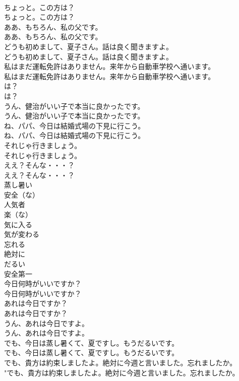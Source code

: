\documentclass[8pt]{extreport}
\begin{document}
\begin{CJK}{UTF8}{min}
\\	ちょっと。この方は？	
\\	ちょっと。この方は？ 
\\	ああ、もちろん、私の父です。	
\\	ああ、もちろん、私の父です。 
\\	どうも初めまして、夏子さん。話は良く聞きますよ。	
\\	どうも初めまして、夏子さん。話は良く聞きますよ。 
\\	私はまだ運転免許はありません。来年から自動車学校へ通います。	
\\	私はまだ運転免許はありません。来年から自動車学校へ通います。 
\\	は？	
\\	は？ 
\\	うん、健治がいい子で本当に良かったです。	
\\	うん、健治がいい子で本当に良かったです。 
\\	ね、パパ、今日は結婚式場の下見に行こう。	
\\	ね、パパ、今日は結婚式場の下見に行こう。 
\\	それじゃ行きましょう。	
\\	それじゃ行きましょう。 
\\	ええ？そんな・・・？	
\\	ええ？そんな・・・？ 
\\	蒸し暑い
\\	安全（な）
\\	人気者
\\	楽（な）
\\	気に入る
\\	気が変わる
\\	忘れる
\\	絶対に
\\	だるい
\\	安全第一
\\	今日何時がいいですか？	
\\	今日何時がいいですか？ 
\\	あれは今日ですか？	
\\	あれは今日ですか？ 
\\	うん、あれは今日ですよ。	
\\	うん、あれは今日ですよ。 
\\	でも、今日は蒸し暑くて、夏ですし。もうだるいです。	
\\	でも、今日は蒸し暑くて、夏ですし。もうだるいです。 
\\	でも、貴方は約束しましたよ。絶対に今週と言いました。忘れましたか。	
\\	"でも、貴方は約束しましたよ。絶対に今週と言いました。忘れましたか。 

\end{CJK}
\end{document}
